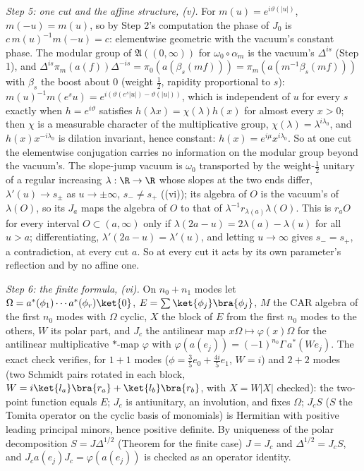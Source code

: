 \emph{Step 5: one cut and the affine structure, (v).} For $m(u) = e^{i\vartheta(|u|)}$, $m(-u) = m(u)$, so by Step 2's computation the phase of $J_{0}$ is $c\,m(u)^{-1}m(-u) = c$: elementwise geometric with the vacuum's constant phase. The modular group of $\mathfrak{A}((0, \infty))$ for $\omega_{0}\circ\alpha_{m}$ is the vacuum's $\Delta^{is}$ (Step 1), and $\Delta^{is}\pi_{m}(a(f))\Delta^{-is} = \pi_{0}(a(\beta_{s}(mf))) = \pi_{m}(a(m^{-1}\beta_{s}(mf)))$ with $\beta_{s}$ the boost about $0$ (weight $\tfrac12$, rapidity proportional to $s$): $m(u)^{-1}m(e^{s}u) = e^{i(\vartheta(e^{s}|u|) - \vartheta(|u|))}$, which is independent of $u$ for every $s$ exactly when $h = e^{i\vartheta}$ satisfies $h(\lambda x) = \chi(\lambda)h(x)$ for almost every $x > 0$; then $\chi$ is a measurable character of the multiplicative group, $\chi(\lambda) = \lambda^{i\lambda_{0}}$, and $h(x)x^{-i\lambda_{0}}$ is dilation invariant, hence constant: $h(x) = e^{i\mu}x^{i\lambda_{0}}$. So at one cut the elementwise conjugation carries no information on the modular group beyond the vacuum's. The slope-jump vacuum is $\omega_{0}$ transported by the weight-$\tfrac12$ unitary of a regular increasing $\lambda : \R \to \R$ whose slopes at the two ends differ, $\lambda'(u) \to s_{\pm}$ as $u \to \pm\infty$, $s_{-} \neq s_{+}$ ((vi)); its algebra of $O$ is the vacuum's of $\lambda(O)$, so its $J_{a}$ maps the algebra of $O$ to that of $\lambda^{-1}r_{\lambda(a)}\lambda(O)$. This is $r_{a}O$ for every interval $O \subset (a, \infty)$ only if $\lambda(2a - u) = 2\lambda(a) - \lambda(u)$ for all $u > a$; differentiating, $\lambda'(2a - u) = \lambda'(u)$, and letting $u \to \infty$ gives $s_{-} = s_{+}$, a contradiction, at every cut $a$. So at every cut it acts by its own parameter's reflection and by no affine one.

\emph{Step 6: the finite formula, (vi).} On $n_{0} + n_{1}$ modes let $\Omega = a^{*}(\phi_{1})\cdots a^{*}(\phi_{r})\ket{0}$, $E = \sum\ket{\phi_{j}}\bra{\phi_{j}}$, $M$ the CAR algebra of the first $n_{0}$ modes with $\Omega$ cyclic, $X$ the block of $E$ from the first $n_{0}$ modes to the others, $W$ its polar part, and $J_{c}$ the antilinear map $x\Omega \mapsto \varphi(x)\Omega$ for the antilinear multiplicative $*$-map $\varphi$ with $\varphi(a(e_{j})) = (-1)^{n_{0}}\Gamma\,a^{*}(We_{j})$. The exact check verifies, for $1 + 1$ modes ($\phi = \tfrac35e_{0} + \tfrac{4i}{5}e_{1}$, $W = i$) and $2 + 2$ modes (two Schmidt pairs rotated in each block, $W = i\ket{l_{a}}\bra{r_{a}} + \ket{l_{b}}\bra{r_{b}}$, with $X = W|X|$ checked): the two-point function equals $E$; $J_{c}$ is antiunitary, an involution, and fixes $\Omega$; $J_{c}S$ ($S$ the Tomita operator on the cyclic basis of monomials) is Hermitian with positive leading principal minors, hence positive definite. By uniqueness of the polar decomposition $S = J\Delta^{1/2}$ (Theorem  for the finite case) $J = J_{c}$ and $\Delta^{1/2} = J_{c}S$, and $J_{c}a(e_{j})J_{c} = \varphi(a(e_{j}))$ is checked as an operator identity.
